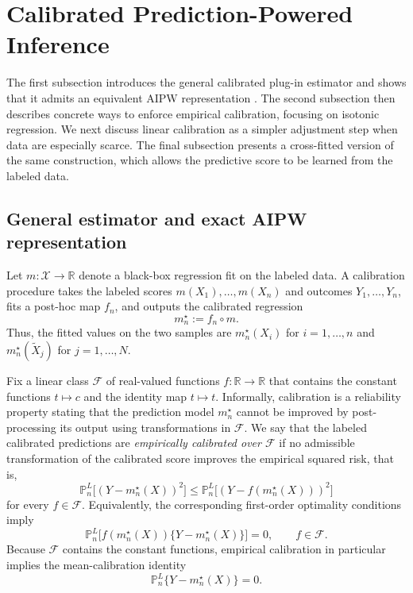 \documentclass{article}
\theoremstyle{plain}
\theoremstyle{definition}
\newcommand{\1}{\mathbbm{1}}
\newcommand{\mhat}{m}
\newcommand{\fhat}{f_n}
\newcommand{\mtilde}{m_n^\star}
\newcommand{\Pl}{\mathbb{P}^{L}_n}
\begin{document}
\section{Calibrated Prediction-Powered Inference}
\label{sec:calppi}
The first subsection introduces the general calibrated plug-in estimator and shows that it admits an equivalent AIPW representation \citep{chattopadhyay2023implied, bruns2025augmented}. The second subsection then describes concrete ways to enforce empirical calibration, focusing on isotonic regression. We next discuss linear calibration as a simpler adjustment step when data are especially scarce. The final subsection presents a cross-fitted version of the same construction, which allows the predictive score to be learned from the labeled data.

\subsection{General estimator and exact AIPW representation}

Let \(\mhat:\mathcal X\to\mathbb R\) denote a black-box regression fit on the labeled data. A calibration procedure takes the labeled scores \(\mhat(X_1),\dots,\mhat(X_n)\) and outcomes \(Y_1,\dots,Y_n\), fits a post-hoc map \(\fhat\), and outputs the calibrated regression
\[
\mtilde := \fhat\circ\mhat.
\]
Thus, the fitted values on the two samples are \(\mtilde(X_i)\) for \(i=1,\dots,n\) and \(\mtilde(\widetilde X_j)\) for \(j=1,\dots,N\).

Fix a linear class \(\mathcal F\) of real-valued functions \(f:\mathbb R\to\mathbb R\) that contains the constant functions $t \mapsto c$ and the identity map \(t\mapsto t\). Informally, calibration is a reliability property stating that the prediction model \(\mtilde\) cannot be improved by post-processing its output using transformations in \(\mathcal F\). We say that the labeled calibrated predictions are \emph{empirically calibrated over \(\mathcal F\)} if no admissible transformation of the calibrated score improves the empirical squared risk, that is,
\begin{equation}
\label{eq:cal-risk}
\Pl\bigl[(Y-\mtilde(X))^2\bigr]
\le
\Pl\bigl[(Y-f(\mtilde(X)))^2\bigr]
\end{equation}
for every \(f\in\mathcal F\). Equivalently, the corresponding first-order optimality conditions imply
\begin{equation}
\label{eq:cal-score}
\Pl\bigl[f(\mtilde(X))\{Y-\mtilde(X)\}\bigr]=0,
\qquad
f\in\mathcal F.
\end{equation}
Because \(\mathcal F\) contains the constant functions, empirical calibration in particular implies the mean-calibration identity
\[
\Pl\{Y-\mtilde(X)\}=0.
\]
\end{document}
